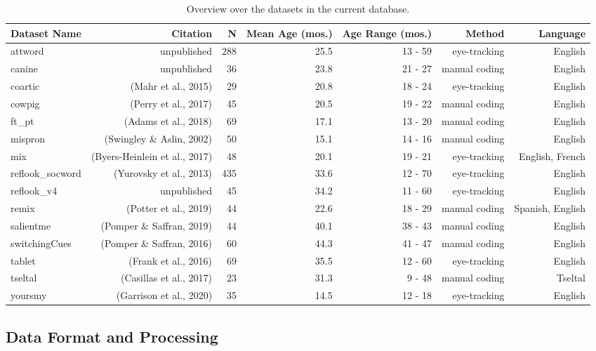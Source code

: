 \documentclass[10pt, letterpaper]{article}
\begin{document}
\begin{table}[ht]
\centering
\begingroup\fontsize{9pt}{10pt}\selectfont
\begin{tabular}{lrrrrrr}
  \hline
Dataset Name & Citation & N & Mean Age (mos.) & Age Range (mos.) & Method & Language \\ 
  \hline
attword & unpublished & 288 & 25.5 & 13 - 59 & eye-tracking & English \\ 
  canine & unpublished & 36 & 23.8 & 21 - 27 & manual coding & English \\ 
  coartic & (Mahr et al., 2015) & 29 & 20.8 & 18 - 24 & eye-tracking & English \\ 
  cowpig & (Perry et al., 2017) & 45 & 20.5 & 19 - 22 & manual coding & English \\ 
  ft\_pt & (Adams et al., 2018) & 69 & 17.1 & 13 - 20 & manual coding & English \\ 
  mispron & (Swingley \& Aslin, 2002) & 50 & 15.1 & 14 - 16 & manual coding & English \\ 
  mix & (Byers-Heinlein et al., 2017) & 48 & 20.1 & 19 - 21 & eye-tracking & English, French \\ 
  reflook\_socword & (Yurovsky et al., 2013) & 435 & 33.6 & 12 - 70 & eye-tracking & English \\ 
  reflook\_v4 & unpublished & 45 & 34.2 & 11 - 60 & eye-tracking & English \\ 
  remix & (Potter et al., 2019) & 44 & 22.6 & 18 - 29 & manual coding & Spanish, English \\ 
  salientme & (Pomper \& Saffran, 2019) & 44 & 40.1 & 38 - 43 & manual coding & English \\ 
  switchingCues & (Pomper \& Saffran, 2016) & 60 & 44.3 & 41 - 47 & manual coding & English \\ 
  tablet & (Frank et al., 2016) & 69 & 35.5 & 12 - 60 & eye-tracking & English \\ 
  tseltal & (Casillas et al., 2017) & 23 & 31.3 & 9 - 48 & manual coding & Tseltal \\ 
  yoursmy & (Garrison et al., 2020) & 35 & 14.5 & 12 - 18 & eye-tracking & English \\ 
   \hline
\end{tabular}
\endgroup
\caption{Overview over the datasets in the current database.} 
\end{table}

\hypertarget{data-format-and-processing}{%
\subsection{Data Format and
Processing}\label{data-format-and-processing}}
\end{document}

